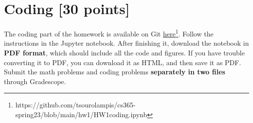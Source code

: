   \section{Coding [30 points]}

  The coding part of the homework is available on Git \href{https://github.com/tsourolampis/cs365-spring23/tree/main/hw1}{here}\footnote{https://github.com/tsourolampis/cs365-spring23/blob/main/hw1/HW1coding.ipynb}. Follow the instructions in the Jupyter notebook. After finishing it, download the notebook in \textbf{PDF format}, which should include all the code and figures. If you have trouble converting it to PDF, you can download it as HTML, and then save it as PDF. Submit the math problems and coding problems \textbf{separately in two files} through Gradescope.

